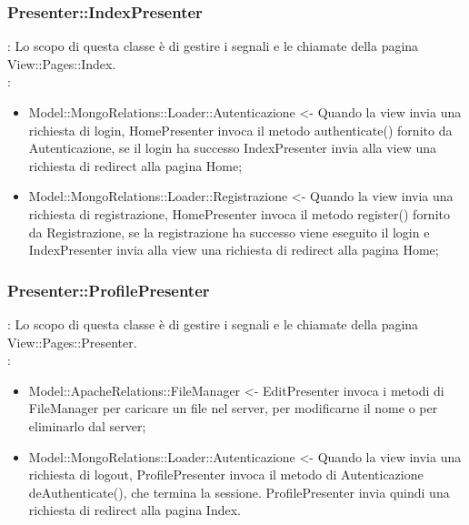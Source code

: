 {		\subsubsection{Presenter::IndexPresenter}{
				\textbf{\tipo}: Lo scopo di questa classe è di gestire i segnali e le chiamate della pagina View::Pages::Index.\\	
				\textbf{\relaz}:
					\begin{itemize}
						\item Model::MongoRelations::Loader::Autenticazione <- Quando la view invia una richiesta di login, HomePresenter invoca il metodo authenticate() fornito da Autenticazione, se il login ha successo IndexPresenter invia alla view una richiesta di redirect alla pagina Home;
						\item Model::MongoRelations::Loader::Registrazione <- Quando la view invia una richiesta di registrazione, HomePresenter invoca il metodo register() fornito da Registrazione, se la registrazione ha successo viene eseguito il login e IndexPresenter invia alla view una richiesta di redirect alla pagina Home;
					\end{itemize}
		}
				
		\subsubsection{Presenter::ProfilePresenter}{
						\textbf{\tipo}: Lo scopo di questa classe è di gestire i segnali e le chiamate della pagina View::Pages::Presenter.\\	
						\textbf{\relaz}:
							\begin{itemize}
								\item Model::ApacheRelations::FileManager <- EditPresenter invoca i metodi di FileManager per caricare un file nel server, per modificarne il nome o per eliminarlo dal server;
								\item Model::MongoRelations::Loader::Autenticazione <- Quando la view invia una richiesta di logout, ProfilePresenter invoca il metodo di Autenticazione deAuthenticate(), che termina la sessione. ProfilePresenter invia quindi una richiesta di redirect alla pagina Index.
							\end{itemize}
				}
			}